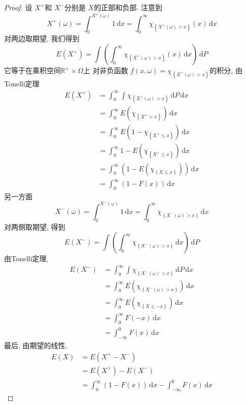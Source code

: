 \documentclass[../main.tex]{subfiles}
\begin{document}
\begin{proof}
    设 \(  X^{+ }  \)和 \(  X^{-}  \)分别是 \(  X  \)的正部和负部.   注意到 \[
    X^{+ }\left(  \omega  \right)= \int_{0}^{X^{+ }\left(  \omega  \right) }1\,\mathrm{d} x= \int_{0}^{\infty}\chi _{\left\{ X^{+ }\left(  \omega  \right)>  x  \right\} }\left( x \right)\,\mathrm{d} x  
    \]对两边取期望, 我们得到 \[
    E\left( X^{+ } \right)= \int \left( \int_{0}^{\infty}\chi _{\left\{ X^{+ }\left(  \omega  \right)> x  \right\} }\left( x \right)\,\mathrm{d} x  \right)\,\mathrm{d} P  
    \]它等于在乘积空间\(  \mathbb{R} ^{+ }\times  \Omega   \)上 对非负函数 \(  f\left( x, \omega  \right)= \chi _{\left\{ X^{+ }\left(  \omega  \right)> x  \right\}} \)的积分, 由Tonelli定理 \[
   \begin{aligned}
    E\left( X^{+ } \right)&=  \int_{0}^{\infty} \int \chi _{\left\{ X^{+ }\left(  \omega  \right)>  x  \right\} }\,\mathrm{d} P\,\mathrm{d} x   \\ 
     &= \int_{0}^{\infty} E\left(\chi _{\left\{ X^{+ }>  x \right\}}  \right)\,\mathrm{d} x\\ 
      &= \int_{0}^{\infty} E\left( 1-\chi _{\left\{ X^{+ }\le x \right\}} \right)\,\mathrm{d} x\\ 
       &= \int_{0}^{\infty}1- E\left( \chi _{\left\{ X^{+ }\le x \right\}} \right)\,\mathrm{d} x\\ 
        &= \int_{0}^{\infty}\left( 1- E\left( \chi _{\left\{ X\le x \right\}} \right)  \right)\,\mathrm{d} x    \\ 
         &= \int_{0}^{\infty}\left( 1-F\left( x \right)  \right)\,\mathrm{d} x 
   \end{aligned}
    \] 另一方面 \[
    X^{-}\left(  \omega  \right)= \int_{0}^{X^{-}\left(  \omega  \right) }1\,\mathrm{d} x= \int_{0}^{\infty}\chi_{ \left\{ X^{-}\left(  \omega  \right)> x  \right\}}\,\mathrm{d} x  
    \]对两侧取期望, 得到 \[
    E\left( X^{-} \right)= \int \left( \int_{0}^{\infty}\chi _{\left\{ X^{-}\left(  \omega  \right)> x  \right\}}\,\mathrm{d} x \right)  \,\mathrm{d} P
    \]由Tonelli定理,  \[
    \begin{aligned}
    E\left( X^{-} \right)&=  \int_{0}^{\infty}  \int \chi _{\left\{ X^{-}\left(  \omega  \right)> x  \right\}}\,\mathrm{d} P   \,\mathrm{d} x\\ 
     &= \int_{0}^{\infty}E\left( \chi _{\left\{ X^{-}\left(  \omega  \right)  > x\right\}} \right)\,\mathrm{d} x\\ 
      &= \int_{0}^{\infty}E\left( \chi _{\left\{ X\le -x \right\}} \right)\,\mathrm{d} x\\ 
       &= \int_{0}^{\infty}F\left( -x \right)\,\mathrm{d} x\\ 
        &= \int_{-\infty}^{0}F\left( x \right)\,\mathrm{d} x     
    \end{aligned}
    \]最后, 由期望的线性,  \[
    \begin{aligned}
    E\left( X \right)&= E\left( X^{+ }-X^{-} \right)\\ 
     &= E\left( X^{+ } \right)-E\left( X^{-} \right)\\ 
      &= \int_{0}^{\infty}\left( 1-F\left( x \right)  \right)\,\mathrm{d} x-\int_{-\infty}^{0}F\left( x \right)\,\mathrm{d} x       
    \end{aligned}
    \]
\end{proof}
\end{document}
